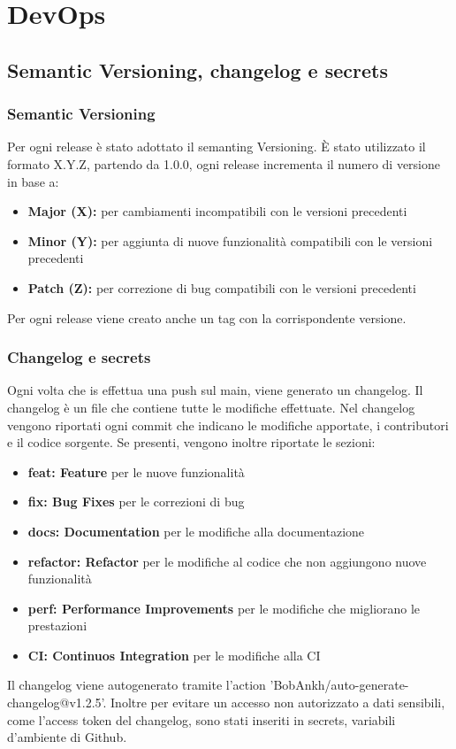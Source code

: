 
\chapter{DevOps}
\label{ch:DevOps} %
\section{Semantic Versioning, changelog e secrets}
\subsection{Semantic Versioning}
Per ogni release è stato adottato il semanting Versioning. È stato utilizzato il formato X.Y.Z, partendo da 1.0.0, ogni release incrementa il numero di versione in base a:
\begin{itemize}
    \item \textbf{Major (X):} per cambiamenti incompatibili con le versioni precedenti
    \item \textbf{Minor (Y):} per aggiunta di nuove funzionalità compatibili con le versioni precedenti
    \item \textbf{Patch (Z):} per correzione di bug compatibili con le versioni precedenti
\end{itemize}
Per ogni release viene creato anche un tag con la corrispondente versione.
\subsection{Changelog e secrets}
Ogni volta che is effettua una push sul main, viene generato un changelog. Il changelog è un file che contiene tutte le modifiche effettuate.
Nel changelog vengono riportati ogni commit che indicano le modifiche apportate, i contributori e il codice sorgente.
Se presenti, vengono inoltre riportate le sezioni: 
\begin{itemize}
    \item \textbf{feat: Feature} per le nuove funzionalità
    \item \textbf{fix: Bug Fixes} per le correzioni di bug
    \item \textbf{docs: Documentation} per le modifiche alla documentazione
    \item \textbf{refactor: Refactor} per le modifiche al codice che non aggiungono nuove funzionalità
    \item \textbf{perf: Performance Improvements} per le modifiche che migliorano le prestazioni
    \item \textbf{CI: Continuos Integration} per le modifiche alla CI
\end{itemize}
Il changelog viene autogenerato tramite l'action 'BobAnkh/auto-generate-changelog@v1.2.5'.
Inoltre per evitare un accesso non autorizzato a dati sensibili, come l'access token del changelog, sono stati inseriti in secrets, variabili d'ambiente di Github. 

